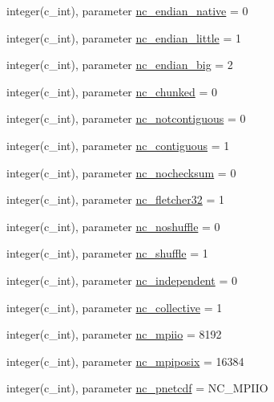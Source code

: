 \begin{DoxyCompactItemize}
integer(c\+\_\+int), parameter \hyperlink{namespacenetcdf__nc__data_ab48141d6b882e3aebb9186fc335a5aca}{nc\+\_\+endian\+\_\+native} = 0
\item 
integer(c\+\_\+int), parameter \hyperlink{namespacenetcdf__nc__data_ac19c8962a4354f48d66946d5b9ca1bb6}{nc\+\_\+endian\+\_\+little} = 1
\item 
integer(c\+\_\+int), parameter \hyperlink{namespacenetcdf__nc__data_ac0943c2fbde94f4eff05e12d0d45af5c}{nc\+\_\+endian\+\_\+big} = 2
\item 
integer(c\+\_\+int), parameter \hyperlink{namespacenetcdf__nc__data_a6dfffe49a4813a9de15e1c125b455fcc}{nc\+\_\+chunked} = 0
\item 
integer(c\+\_\+int), parameter \hyperlink{namespacenetcdf__nc__data_a15cb5ea532dce436d6e09a6763789895}{nc\+\_\+notcontiguous} = 0
\item 
integer(c\+\_\+int), parameter \hyperlink{namespacenetcdf__nc__data_a456ac0c8980e5952cdea6ecd7474b78f}{nc\+\_\+contiguous} = 1
\item 
integer(c\+\_\+int), parameter \hyperlink{namespacenetcdf__nc__data_afdaf9fe5a5476375552e52da08dd30f1}{nc\+\_\+nochecksum} = 0
\item 
integer(c\+\_\+int), parameter \hyperlink{namespacenetcdf__nc__data_a22e70218074a1eaa208303b3457d4029}{nc\+\_\+fletcher32} = 1
\item 
integer(c\+\_\+int), parameter \hyperlink{namespacenetcdf__nc__data_ace951380dd41179847dfd7a26a9cac39}{nc\+\_\+noshuffle} = 0
\item 
integer(c\+\_\+int), parameter \hyperlink{namespacenetcdf__nc__data_a1a38e88f099ae79186fedabf193684e6}{nc\+\_\+shuffle} = 1
\item 
integer(c\+\_\+int), parameter \hyperlink{namespacenetcdf__nc__data_afa082ef2e4964d0eab52a82d96737a43}{nc\+\_\+independent} = 0
\item 
integer(c\+\_\+int), parameter \hyperlink{namespacenetcdf__nc__data_aec06d12fbb07bf45435d9820501fc2cc}{nc\+\_\+collective} = 1
\item 
integer(c\+\_\+int), parameter \hyperlink{namespacenetcdf__nc__data_a24a00c693d9f358d39ea74ed945a8add}{nc\+\_\+mpiio} = 8192
\item 
integer(c\+\_\+int), parameter \hyperlink{namespacenetcdf__nc__data_ab68ea6219956d7c6855e01ac6587f91f}{nc\+\_\+mpiposix} = 16384
\item 
integer(c\+\_\+int), parameter \hyperlink{namespacenetcdf__nc__data_a942139d2e6086ea7b93c55f690440d91}{nc\+\_\+pnetcdf} = N\+C\+\_\+\+M\+P\+I\+IO

\end{DoxyCompactItemize}

